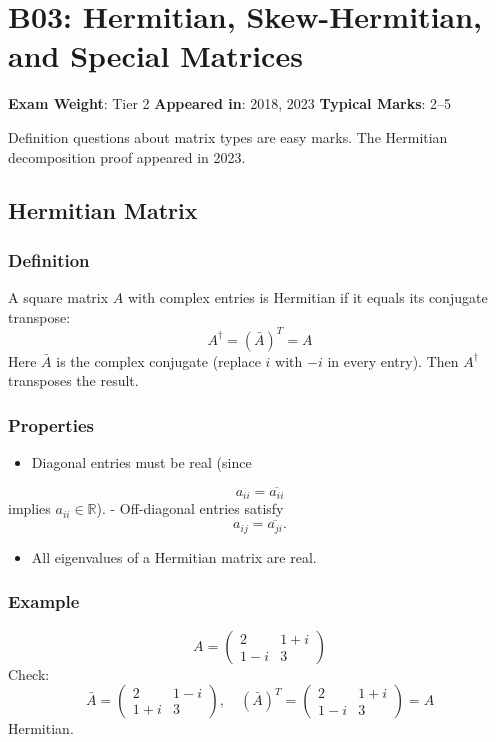 \documentclass[
]{article}
\providecommand{\tightlist}{%
  \setlength{\itemsep}{0pt}\setlength{\parskip}{0pt}}
\renewenvironment{quote}
  {\begin{tcolorbox}[
     colback=calloutbg,
     colframe=calloutframe,
     colupper=callouttext,
     arc=3pt,
     boxrule=0.5pt,
     leftrule=0.5pt,
     borderline west={3pt}{0pt}{calloutaccent},
     left=8pt,
     right=8pt,
     top=6pt,
     bottom=6pt
   ]}
  {\end{tcolorbox}}
\begin{document}
\section{B03: Hermitian, Skew-Hermitian, and Special
Matrices}\label{b03-hermitian-skew-hermitian-and-special-matrices}

\begin{quote}
\textbf{Exam Weight}: Tier 2 \textbar{} \textbf{Appeared in}: 2018, 2023
\textbar{} \textbf{Typical Marks}: 2--5
\end{quote}

Definition questions about matrix types are easy marks. The Hermitian
decomposition proof appeared in 2023.

\subsection{Hermitian Matrix}\label{hermitian-matrix}

\subsubsection{Definition}\label{definition-8}

A square matrix \(A\) with complex entries is Hermitian if it equals its
conjugate transpose:
\[
A^\dagger = (\bar{A})^T = A
\]
Here \(\bar{A}\) is the complex conjugate (replace \(i\) with \(-i\) in
every entry). Then \(A^\dagger\) transposes the result.

\subsubsection{Properties}\label{properties-1}

\begin{itemize}
\tightlist
\item
  Diagonal entries must be real (since
\end{itemize}
\[
a_{ii} = \overline{a_{ii}}
\]
implies \(a_{ii} \in \mathbb{R}\)). - Off-diagonal entries satisfy
\[
a_{ij} = \overline{a_{ji}}.
\]
\begin{itemize}
\tightlist
\item
  All eigenvalues of a Hermitian matrix are real.
\end{itemize}

\subsubsection{Example}\label{example-2}
\[
A =
\begin{pmatrix}
2 & 1+i \\
1-i & 3
\end{pmatrix}
\]
Check:
\[
\bar{A} =
\begin{pmatrix}
2 & 1-i \\
1+i & 3
\end{pmatrix}, \quad (\bar{A})^T = \begin{pmatrix} 2 & 1+i \\ 1-i & 3 \end{pmatrix} = A
\]
Hermitian.
\end{document}
